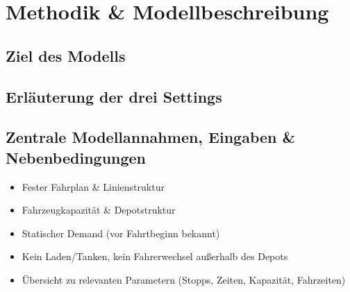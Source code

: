 \chapter{Methodik \& Modellbeschreibung}
\section{Ziel des Modells}

\section{Erläuterung der drei Settings}

\section{Zentrale Modellannahmen, Eingaben \& Nebenbedingungen}
\begin{itemize}
    \item Fester Fahrplan \& Linienstruktur
    \item Fahrzeugkapazität \& Depotstruktur
    \item Statischer Demand (vor Fahrtbeginn bekannt)
    \item Kein Laden/Tanken, kein Fahrerwechsel außerhalb des Depots
    \item Übersicht zu relevanten Parametern (Stopps, Zeiten, Kapazität, Fahrzeiten)
\end{itemize}
